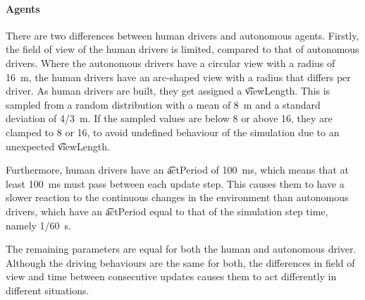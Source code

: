 

\paragraph{Agents}
There are two differences between human drivers and autonomous agents. Firstly, the field of view of the human drivers is limited, compared to that of autonomous drivers. Where the autonomous drivers have a circular view with a radius of \SI{16}{\meter}, the human drivers have an arc-shaped view with a radius that differs per driver. As human drivers are built, they get assigned a \t{viewLength}. This is sampled from a random distribution with a mean of \SI{8}{\meter} and a standard deviation of \SI{4/3}{\meter}. If the sampled values are below 8 or above 16, they are clamped to 8 or 16, to avoid undefined behaviour of the simulation due to an unexpected \t{viewLength}.

Furthermore, human drivers have an \t{actPeriod} of \SI{100}{\milli\second}, which means that at least \SI{100}{\milli\second} must pass between each update step. This causes them to have a slower reaction to the continuous changes in the environment than autonomous drivers, which have an \t{actPeriod} equal to that of the simulation step time, namely \SI{1/60}{\second}.

The remaining parameters are equal for both the human and autonomous driver. Although the driving behaviours are the same for both, the differences in field of view and time between consecutive updates causes them to act differently in different situations.



